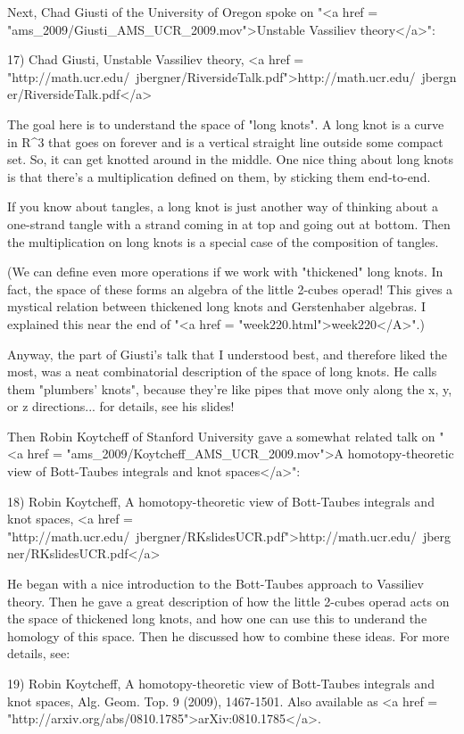 Next, Chad Giusti of the University of Oregon spoke on "<a href =
"ams_2009/Giusti_AMS_UCR_2009.mov">Unstable Vassiliev
theory</a>":
 
17) Chad Giusti, Unstable Vassiliev theory,
<a href = "http://math.ucr.edu/~jbergner/RiversideTalk.pdf">http://math.ucr.edu/~jbergner/RiversideTalk.pdf</a>

The goal here is to understand the space of "long knots".  A
long knot is a curve in R^{3} that goes on forever and is a
vertical straight line outside some compact set.  So, it can get
knotted around in the middle.  One nice thing about long knots is that
there's a multiplication defined on them, by sticking them end-to-end.

If you know about tangles, a long knot is just another way of thinking
about a one-strand tangle with a strand coming in at top and going
out at bottom.  Then the multiplication on long knots is a special 
case of the composition of tangles.

(We can define even more operations if we work with
"thickened" long knots.  In fact, the space of these forms
an algebra of the little 2-cubes operad!  This gives a mystical
relation between thickened long knots and Gerstenhaber algebras.  I
explained this near the end of "<a href =
"week220.html">week220</A>".)

Anyway, the part of Giusti's talk that I understood best, and
therefore liked the most, was a neat combinatorial description
of the space of long knots. He calls them "plumbers' knots",
because they're like pipes that move only along the x, y, or z
directions... for details, see his slides!

Then Robin Koytcheff of Stanford University gave a somewhat related
talk on "<a href = "ams_2009/Koytcheff_AMS_UCR_2009.mov">A homotopy-theoretic view of Bott-Taubes integrals and knot
spaces</a>":

18) Robin Koytcheff, A homotopy-theoretic view of Bott-Taubes integrals
and knot spaces, <a href = "http://math.ucr.edu/~jbergner/RKslidesUCR.pdf">http://math.ucr.edu/~jbergner/RKslidesUCR.pdf</a>

He began with a nice introduction to the Bott-Taubes approach to
Vassiliev theory.  Then he gave a great description of how the
little 2-cubes operad acts on the space of thickened long knots, 
and how one can use this to underand the homology of this space.
Then he discussed how to combine these ideas.  For more details, see:

19) Robin Koytcheff, A homotopy-theoretic view of Bott-Taubes integrals
and knot spaces, Alg. Geom. Top. 9 (2009), 1467-1501.  Also available as
<a href = "http://arxiv.org/abs/0810.1785">arXiv:0810.1785</a>.

